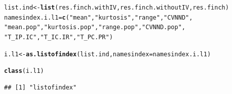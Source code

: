 \documentclass[12pt]{article}\usepackage[]{graphicx}\usepackage[]{color}
\makeatletter
\newcommand{\hlstr}[1]{\textcolor[rgb]{0.192,0.494,0.8}{#1}}%
\newcommand{\hlstd}[1]{\textcolor[rgb]{0.345,0.345,0.345}{#1}}%
\newcommand{\hlkwb}[1]{\textcolor[rgb]{0.69,0.353,0.396}{#1}}%
\newcommand{\hlkwc}[1]{\textcolor[rgb]{0.333,0.667,0.333}{#1}}%
\newcommand{\hlkwd}[1]{\textcolor[rgb]{0.737,0.353,0.396}{\textbf{#1}}}%
\newenvironment{kframe}{%
 \def\at@end@of@kframe{}%
 \ifinner\ifhmode%
  \def\at@end@of@kframe{\end{minipage}}%
  \begin{minipage}{\columnwidth}%
 \fi\fi%
 \def\FrameCommand##1{\hskip\@totalleftmargin \hskip-\fboxsep
 \colorbox{shadecolor}{##1}\hskip-\fboxsep
     \hskip-\linewidth \hskip-\@totalleftmargin \hskip\columnwidth}%
 \MakeFramed {\advance\hsize-\width
   \@totalleftmargin\z@ \linewidth\hsize
   \@setminipage}}%
 {\par\unskip\endMakeFramed%
 \at@end@of@kframe}
\newenvironment{knitrout}{}{} %
\makeatother
\begin{document}
\begin{knitrout}
\color{fgcolor}\begin{kframe}
\begin{alltt}
\hlstd{list.ind}\hlkwb{<-}\hlkwd{list}\hlstd{(res.finch.withIV, res.finch.withoutIV, res.finch)}
\hlstd{namesindex.i.l1}\hlkwb{=}\hlkwd{c}\hlstd{(}\hlstr{"mean"}\hlstd{,} \hlstr{"kurtosis"}\hlstd{,} \hlstr{"range"}\hlstd{,} \hlstr{"CVNND"}\hlstd{,}
                  \hlstr{"mean.pop"}\hlstd{,} \hlstr{"kurtosis.pop"}\hlstd{,} \hlstr{"range.pop"}\hlstd{,} \hlstr{"CVNND.pop"}\hlstd{,}
                  \hlstr{"T_IP.IC"}\hlstd{,} \hlstr{"T_IC.IR"}\hlstd{,} \hlstr{"T_PC.PR"}\hlstd{)}

\hlstd{i.l1}\hlkwb{<-}\hlkwd{as.listofindex}\hlstd{(list.ind,} \hlkwc{namesindex}\hlstd{=namesindex.i.l1)}

\hlkwd{class}\hlstd{(i.l1)}
\end{alltt}
\begin{verbatim}
## [1] "listofindex"
\end{verbatim}
\end{kframe}
\end{knitrout}
\end{document}
